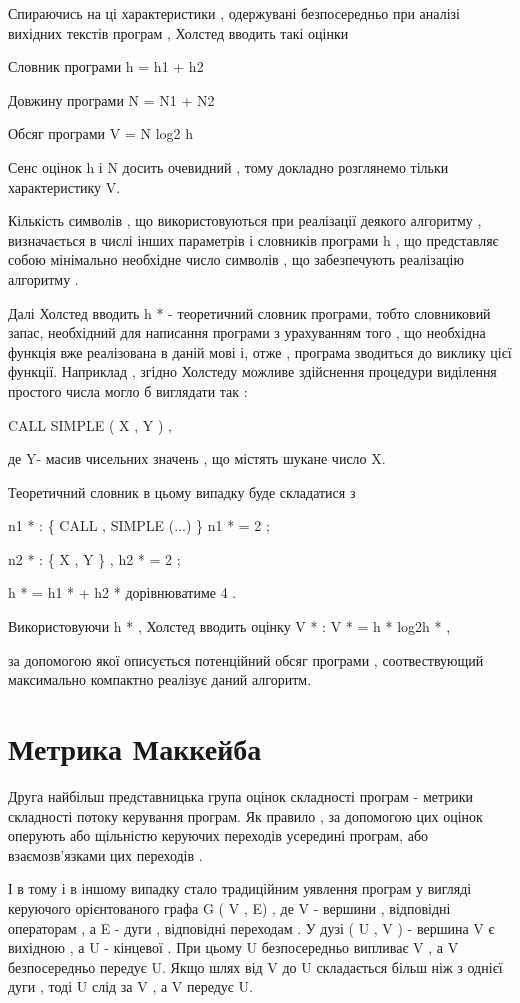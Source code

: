 \documentclass[oneside,final,14pt]{extreport}
\begin{document}
Спираючись на ці характеристики , одержувані безпосередньо при аналізі вихідних текстів програм , Холстед вводить такі оцінки

Словник програми h = h1 + h2

Довжину програми N = N1 + N2

Обсяг програми V = N log2 h

Сенс оцінок h і N досить очевидний , тому докладно розглянемо тільки характеристику V.

Кількість символів , що використовуються при реалізації деякого алгоритму , визначається в числі інших параметрів і словників програми h , що представляє собою мінімально необхідне число символів , що забезпечують реалізацію алгоритму .

Далі Холстед вводить h * - теоретичний словник програми, тобто словниковий запас, необхідний для написання програми з урахуванням того , що необхідна функція вже реалізована в даній мові і, отже , програма зводиться до виклику цієї функції. Наприклад , згідно Холстеду можливе здійснення процедури виділення простого числа могло б виглядати так :

CALL SIMPLE ( X , Y ) ,

де Y- масив чисельних значень , що містять шукане число X.

Теоретичний словник в цьому випадку буде складатися з

n1 * : \{ CALL , SIMPLE (...) \} n1 * = 2 ;

n2 * : \{ X , Y \} , h2 * = 2 ;

h * = h1 * + h2 * дорівнюватиме 4 .

Використовуючи h * , Холстед вводить оцінку V * : V * = h * log2h * ,

за допомогою якої описується потенційний обсяг програми , соотвествующий максимально компактно реалізує даний алгоритм.


\section{Метрика Маккейба}
\label{2section:id11}
Друга найбільш представницька група оцінок складності програм - метрики складності потоку керування програм. Як правило , за допомогою цих оцінок оперують або щільністю керуючих переходів усередині програм, або взаємозв'язками цих переходів .

І в тому і в іншому випадку стало традиційним уявлення програм у вигляді керуючого орієнтованого графа G ( V , E) , де V - вершини , відповідні операторам , а E - дуги , відповідні переходам . У дузі ( U , V ) - вершина V є вихідною , а U - кінцевої . При цьому U безпосередньо випливає V , а V безпосередньо передує U. Якщо шлях від V до U складається більш ніж з однієї дуги , тоді U слід за V , а V передує U.
\end{document}
